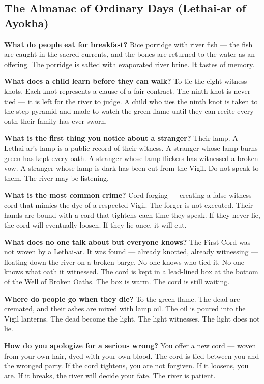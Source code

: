 \subsection*{The Almanac of Ordinary Days (Lethai-ar of Ayokha)}
\begin{almanac}
\textbf{What do people eat for breakfast?} Rice porridge with river fish --- the fish are caught in the sacred currents, and the bones are returned to the water as an offering. The porridge is salted with evaporated river brine. It tastes of memory.

\textbf{What does a child learn before they can walk?} To tie the eight witness knots. Each knot represents a clause of a fair contract. The ninth knot is never tied --- it is left for the river to judge. A child who ties the ninth knot is taken to the step-pyramid and made to watch the green flame until they can recite every oath their family has ever sworn.

\textbf{What is the first thing you notice about a stranger?} Their lamp. A Lethai-ar's lamp is a public record of their witness. A stranger whose lamp burns green has kept every oath. A stranger whose lamp flickers has witnessed a broken vow. A stranger whose lamp is dark has been cut from the Vigil. Do not speak to them. The river may be listening.

\textbf{What is the most common crime?} Cord-forging --- creating a false witness cord that mimics the dye of a respected Vigil. The forger is not executed. Their hands are bound with a cord that tightens each time they speak. If they never lie, the cord will eventually loosen. If they lie once, it will cut.

\textbf{What does no one talk about but everyone knows?} The First Cord was not woven by a Lethai-ar. It was found --- already knotted, already witnessing --- floating down the river on a broken barge. No one knows who tied it. No one knows what oath it witnessed. The cord is kept in a lead-lined box at the bottom of the Well of Broken Oaths. The box is warm. The cord is still waiting.

\textbf{Where do people go when they die?} To the green flame. The dead are cremated, and their ashes are mixed with lamp oil. The oil is poured into the Vigil lanterns. The dead become the light. The light witnesses. The light does not lie.

\textbf{How do you apologize for a serious wrong?} You offer a new cord --- woven from your own hair, dyed with your own blood. The cord is tied between you and the wronged party. If the cord tightens, you are not forgiven. If it loosens, you are. If it breaks, the river will decide your fate. The river is patient.


\end{almanac}
